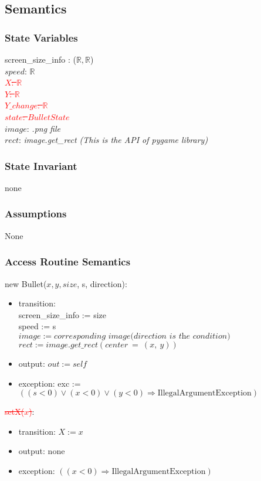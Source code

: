 \documentclass[12pt]{article}
\begin{document}
\subsection*{Semantics}
\subsubsection*{State Variables}
screen\_size\_info : ($\mathbb{R}, \mathbb{R}$)\\
$\mathit{speed}$: $\mathbb{R}$\\
\textcolor{red}{\st{
$\mathit{X}$: $\mathbb{R}$}}\\
\textcolor{red}{\st{
$\mathit{Y}$: $\mathbb{R}$}}\\
\textcolor{red}{\st{
$\mathit{Y\_change}$: $\mathbb{R}$}}\\
\textcolor{red}{\st{
$\mathit{state}$: $BulletState$}}\\
$\mathit{image}$: \textit{.png file}\\
$\mathit{rect}$: \textit{image.get\_rect (This is the API of pygame library)}
\subsubsection*{State Invariant}
none
\subsubsection*{Assumptions}
None
\subsubsection*{Access Routine Semantics}
\noindent new Bullet($\mathit{x}, \mathit{y}, \mathit{size}$, s, direction):
\begin{itemize}
\item transition:\\ screen\_size\_info := size \\ speed := s\\$image := \textit{corresponding image(direction is the condition)}$\\
 $rect := image.get\_rect(center\ =\ (x,\ y))$

\item output: $out := \mathit{self}$
\item exception: exc := $((\mathit{s} < 0) \vee (\mathit{x} < 0) \vee 
  (\mathit{y} < 0) \Rightarrow \text{IllegalArgumentException})$
\end{itemize}

\noindent \textcolor{red}{\st{
setX($\mathit{x}$)}}:
\begin{itemize}
\item transition: $X := x$ 
\item output: none
\item exception: $((\mathit{x} < 0) \Rightarrow \text{IllegalArgumentException})$
\end{itemize}
\end{document}
